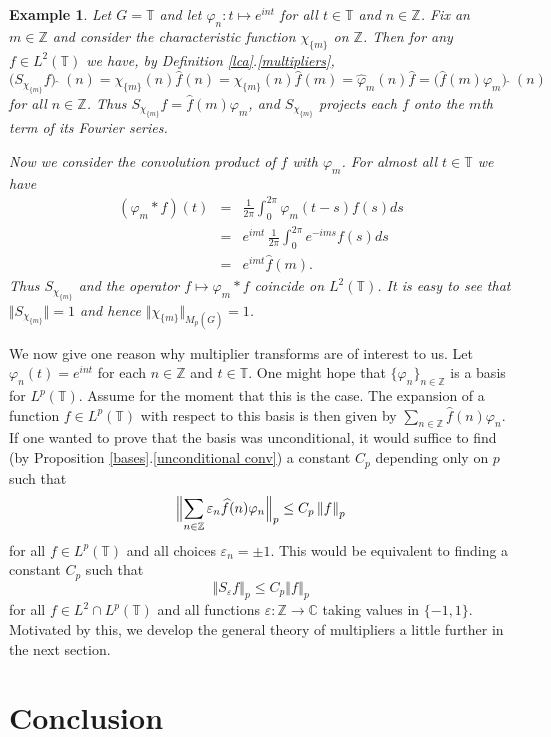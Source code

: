 \documentclass[mstat,12pt]{unswthesis}  %
\newcommand{\C}{\mathbb{C}}
\newcommand{\T}{\mathbb{T}}
\newcommand{\Z}{\mathbb{Z}}
\newcommand{\hatt}[1]{\widehat #1}
\newcommand{\reff}[2]{\ref{#1}.\ref{#2}}
\def\norm#1{\left \Vert #1 \right \Vert}
\def\snorm#1{\Bigl \Vert #1 \Bigr \Vert}
\def\ssnorm#1{\Vert #1 \Vert}
\newtheorem{example}[theorem]{Example}
\numberwithin{equation}{section}
\begin{document}
\begin{example}\label{lca example}
Let $G=\T$ and let $\varphi_n:t\mapsto e^{int}$ for all $t\in\T$ and $n\in\Z$.
Fix an $m\in\Z$ 
and consider the characteristic function $\chi_{\{m\}}$ on $\Z$.
Then for any $f\in L^2(\T)$ we have, by Definition \reff{lca}{multipliers},
\[\bigl(S_{\chi_{\{m\}}}f\bigr)\,\hatt{\,}\,(n)=\chi_{\{m\}}(n)\hatt{f}(n)
=\chi_{\{m\}}(n)\hatt{f}(m)=\hatt{\varphi}_m(n)\hatt{f}=
\bigl(\hatt{f}(m)\varphi_m\bigr)\,\hatt{\,}\,(n)\]
for all $n\in\Z$. Thus $S_{\chi_{\{m\}}}f=\hatt{f}(m)\varphi_m$, and
$S_{\chi_{\{m\}}}$ projects each $f$ onto the $m$th term of its Fourier
series.

Now we consider the convolution product of $f$ with $\varphi_m$.
For almost all $t\in\T$ we have
\begin{eqnarray*}
(\varphi_m*f)(t) &=& \frac{1}{2\pi}\int_0^{2\pi}\varphi_m(t-s)f(s)ds \\
& = & e^{imt}\,\frac{1}{2\pi}\int_0^{2\pi}e^{-ims}f(s)ds \\
& = & e^{imt}\hatt{f}(m).
\end{eqnarray*}
Thus $S_{\chi_{\{m\}}}$ and the operator $f\mapsto\varphi_m*f$ coincide on
$L^2(\T)$. It is easy to see that $\ssnorm{S_{\chi_{\{m\}}}}=1$ and hence
$\ssnorm{\chi_{\{m\}}}_{M_p(\hatt{G})}=1$.
\end{example}

We now give one reason why multiplier transforms are of interest to us.
Let $\varphi_n(t)=e^{int}$ for each $n\in\Z$ and $t\in\T$. One might hope that
$\{\varphi_n\}_{n\in\Z}$ is a basis for $L^p(\T)$. Assume for the moment that 
this is the case. The expansion of a
function $f\in L^p(\T)$ with respect to this basis is then given by
$\sum_{n\in\Z}\hatt{f}(n)\varphi_n$. 
If one wanted to prove that the basis was unconditional, it would suffice to
find (by Proposition \reff{bases}{unconditional conv}) a constant $C_p$
depending only on $p$ such that
\[\snorm{\sum_{n\in\Z}\varepsilon_n\hatt{f}(n)\varphi_n}_p\leq C_p\norm{f}_p\]
for all $f\in L^p(\T)$ and all choices
$\varepsilon_n=\pm 1$. This would be
equivalent to finding a constant $C_p$ such that
\[\norm{S_{\varepsilon}f}_p\leq C_p\norm{f}_p\]
for all $f\in L^2\cap L^p(\T)$ and all functions $\varepsilon:\Z\rightarrow\C$
taking values in $\{-1,1\}$. Motivated by this, we develop the general theory of
multipliers a little further in the next section.

\chapter{Conclusion}\label{ccl}
\end{document}
